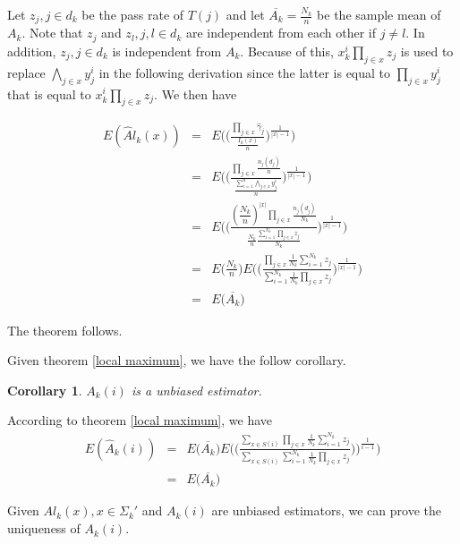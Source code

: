 \documentclass[10pt,onecolumn]{IEEEtran}
\newtheorem{corollary}{\bf Corollary}
\begin{document}
\begin{IEEEproof}
Let $z_j, j \in d_k$ be the pass rate of $T(j)$ and let  $\overline{A_k}=\frac{N_k}{n}$ be the sample mean of $A_k$. Note that $z_j$ and $z_l, j, l \in d_k$ are independent from each other if $ j \neq l$. In addition, $z_j, j \in d_k$ is independent from $A_k$. Because of this, $x_k^i\prod_{j \in x} z_j$ is used to replace $\bigwedge_{j \in x} y_j^i$ in the following derivation since the latter is equal to $\prod_{j\in x} y_j^i$ that is equal to $x_k^i\prod_{j \in x} z_j$. We then have

\begin{eqnarray}
E(\widehat Al_k(x))&=&E\Big( \big (\frac{\prod_{j\in x} \hat\gamma_j}{\frac{I_k(x)}{n}}\big)^{\frac{1}{|x|-1}}\Big) \nonumber \\
&=& E\Big(\big(\frac{\prod_{j\in x} \frac{n_j(d_j)}{n}}{\frac{\sum_{i=1}^n \bigwedge_{j \in x} y^i_j}{n}}\big)^{\frac{1}{|x|-1}} \Big )\nonumber \\
&=& E\Big(\big(\frac{(\dfrac{N_k}{n})^{|x|}\prod_{j\in x} \frac{n_j(d_j)}{N_k}}{\frac{N_k}{n} \frac{\sum_{i=1}^{N_k}\prod_{j \in x} z_j}{N_k}}\big)^{\frac{1}{|x|-1}} \Big ) \nonumber \\
&=& E\Big(\frac{N_k}{n}\Big) E\Big(\big(\frac{\prod_{j\in x} \frac{1}{N_k}\sum_{i=1}^{N_k}{z_j}}{\sum_{i=1}^{N_k} \frac{1}{N_k}\prod_{j \in x} {z_j}}\big)^{\frac{1}{|x|-1}}\Big ) \nonumber \\
&=& E\Big (\overline{A_k}\Big)
\end{eqnarray}


The theorem follows.
\end{IEEEproof}
Given theorem \ref{local maximum}, we have the follow corollary.
 \begin{corollary} \label{global expect}
 $A_k(i)$ is a unbiased estimator.
 \end{corollary}
    \begin{IEEEproof}
According to theorem \ref{local maximum}, we have
\begin{eqnarray}
E(\widehat A_k(i))&=&E\Big(\overline{A_k}\Big)E\Big(\big(\frac{\sum_{x \in S(i)}\prod_{j\in x} \frac{1}{N_k}\sum_{i=1}^{N_k}{z_j}}{\sum_{x \in S(i)}\sum_{i=1}^{N_k} \frac{1}{N_k}\prod_{j \in x} {z_j}}\big)\big)^{\frac{1}{i-1}} \Big)\nonumber \\
&=&E\Big (\overline{A_k}\Big)
\label{global estimate}
\end{eqnarray}
\end{IEEEproof}

Given $Al_k(x), x \in \Sigma_k'$ and $A_k(i)$ are unbiased estimators,
we can prove the uniqueness of $A_k(i)$.
\end{document}
